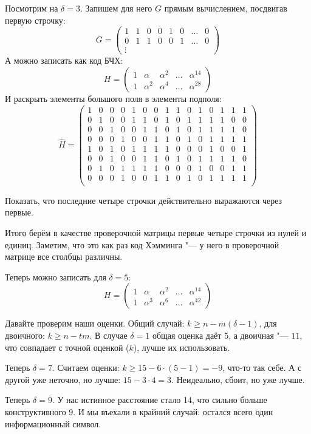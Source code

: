 Посмотрим на $\delta=3$.
Запишем для него $G$ прямым вычислением, посдвигав первую строчку:
\[
G=\begin{pmatrix}
1 & 1 & 0 & 0 & 1 & 0 & \dots & 0 \\
0 & 1 & 1 & 0 & 0 & 1 & \dots & 0 \\
\vdots
\end{pmatrix}
\]
А можно записать как код БЧХ:
\[
H=\begin{pmatrix}
1 & \alpha & \alpha^2 & \dots & \alpha^{14} \\
1 & \alpha^2 & \alpha^4 & \dots & \alpha^{28}
\end{pmatrix}
\]
И раскрыть элементы большого поля в элементы подполя:
\[
\hat H = \begin{pmatrix}
1 & 0 & 0 & 0 & 1 & 0 & 0 & 1 & 1 & 0 & 1 & 0 & 1 & 1 & 1 \\
0 & 1 & 0 & 0 & 1 & 1 & 0 & 1 & 0 & 1 & 1 & 1 & 1 & 0 & 0 \\
0 & 0 & 1 & 0 & 0 & 1 & 1 & 0 & 1 & 0 & 1 & 1 & 1 & 1 & 0 \\
0 & 0 & 0 & 1 & 0 & 0 & 1 & 1 & 0 & 1 & 0 & 1 & 1 & 1 & 1 \\

1 & 0 & 1 & 0 & 1 & 1 & 1 & 1 & 0 & 0 & 0 & 1 & 0 & 0 & 1 \\
0 & 0 & 1 & 0 & 0 & 1 & 1 & 0 & 1 & 0 & 1 & 1 & 1 & 1 & 0 \\
0 & 1 & 0 & 1 & 1 & 1 & 1 & 0 & 0 & 0 & 1 & 0 & 0 & 1 & 1 \\
0 & 0 & 0 & 1 & 0 & 0 & 1 & 1 & 0 & 1 & 0 & 1 & 1 & 1 & 1 \\
\end{pmatrix}
\]
\begin{Exercise}
Показать, что последние четыре строчки действительно выражаются через первые.
\end{Exercise}
Итого берём в качестве проверочной матрицы первые четыре строчки из нулей и единиц.
Заметим, что это как раз код Хэмминга "--- у него в проверочной матрице все столбцы различны.

Теперь можно записать для $\delta=5$:
\[
H=\begin{pmatrix}
1 & \alpha & \alpha^2 & \dots & \alpha^{14} \\
1 & \alpha^3 & \alpha^6 & \dots & \alpha^{42}
\end{pmatrix}
\]

Давайте проверим наши оценки.
Общий случай: $k \ge n - m(\delta-1)$, для двоичного: $k \ge n - tm$.
В случае $\delta=1$ общая оценка даёт $5$, а двоичная "--- $11$,
что совпадает с точной оценкой ($k$), лучше их использовать.

Теперь $\delta=7$.                          
Считаем оценки: $k \ge 15 - 6 \cdot (5-1) = -9$, что-то так себе.
А с другой уже неточно, но лучше: $15 - 3 \cdot 4=3$.
Неидеально, сбоит, но уже лучше.

Теперь $\delta=9$.
У нас истинное расстояние стало 14, что сильно больше конструктивного 9.
И мы въехали в крайний случай: остался всего один информационный символ.
